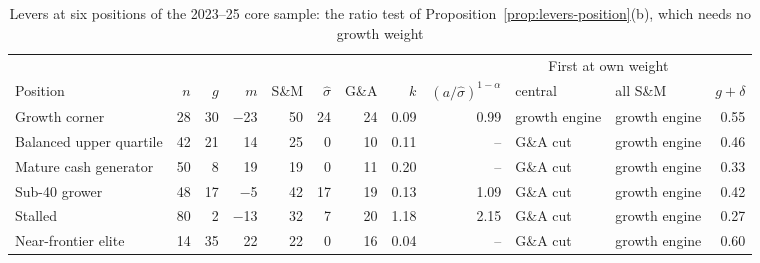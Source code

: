 \begin{table}[t]
\centering
\caption{Levers at six positions of the 2023--25 core sample: the ratio test of Proposition~\ref{prop:levers-position}(b), which needs no growth weight}\label{tab:levers-position}
\scriptsize
\setlength{\tabcolsep}{3pt}
\begin{tabular}{@{}lrrrrrrrrllr@{}}
\toprule
 & & & & & & & & & \multicolumn{2}{c}{First at own weight} & \\
\cmidrule(lr){10-11}
Position & $n$ & $g$ & $m$ & S\&M & $\hat\sigma$ & G\&A & $k$ & $(a/\hat\sigma)^{1-\alpha}$ & central & all S\&M & $g+\delta$\\
\midrule
Growth corner & 28 & 30 & \ensuremath{-}23 & 50 & 24 & 24 & 0.09 & 0.99 & growth engine & growth engine & 0.55 \\
Balanced upper quartile & 42 & 21 & 14 & 25 & 0 & 10 & 0.11 & -- & G\&A cut & growth engine & 0.46 \\
Mature cash generator & 50 & 8 & 19 & 19 & 0 & 11 & 0.20 & -- & G\&A cut & growth engine & 0.33 \\
Sub-40 grower & 48 & 17 & \ensuremath{-}5 & 42 & 17 & 19 & 0.13 & 1.09 & G\&A cut & growth engine & 0.42 \\
Stalled & 80 & 2 & \ensuremath{-}13 & 32 & 7 & 20 & 1.18 & 2.15 & G\&A cut & growth engine & 0.27 \\
Near-frontier elite & 14 & 35 & 22 & 22 & 0 & 16 & 0.04 & -- & G\&A cut & growth engine & 0.60 \\
\bottomrule
\end{tabular}


\end{table}
